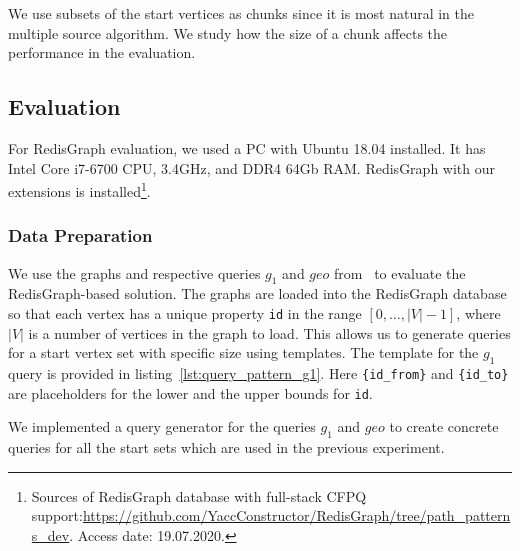 We use subsets of the start vertices as chunks since it is most natural in the multiple source algorithm.
We study how the size of a chunk affects the performance in the evaluation.

\subsection{Evaluation}

For RedisGraph evaluation, we used a PC with Ubuntu 18.04 installed.
It has Intel Core i7-6700 CPU, 3.4GHz, and DDR4 64Gb RAM.
RedisGraph with our extensions is installed\footnote{Sources of RedisGraph database with full-stack CFPQ support:\url{https://github.com/YaccConstructor/RedisGraph/tree/path_patterns_dev}. Access date: 19.07.2020.}.

\subsubsection{Data Preparation}

We use the graphs and respective queries $g_1$ and $geo$ from~\cite{10.1145/3398682.3399163} to evaluate the RedisGraph-based solution.
The graphs are loaded into the RedisGraph database so that each vertex has a unique property \verb|id| in the range $[0, \ldots, |V|-1]$, where $|V|$ is a number of vertices in the graph to load.
This allows us to generate queries for a start vertex set with specific size using templates.
The template for the $g_1$ query is provided in listing~\ref{lst:query_pattern_g1}.
Here \texttt{\{id\_from\}} and \texttt{\{id\_to\}} are placeholders for the lower and the upper bounds for \verb|id|.

\begin{algorithm}
\end{algorithm}

We implemented a query generator for the queries $g_1$ and $geo$ to create concrete queries for all the start sets which are used in the previous experiment.


